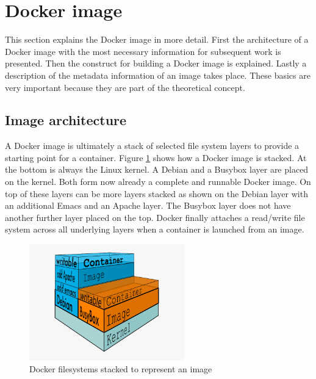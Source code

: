 \section{Docker image}
\label{sec:intro:docker_image:docker_img}
This section explains the Docker image in more detail. First the architecture of a Docker image with the most necessary information for subsequent work is presented. Then the construct for building a Docker image is explained. 
Lastly a description of the metadata information of an image takes place. These basics are very important because they are part of the theoretical concept.

\subsection{Image architecture}
\label{sec:intro:docker_image:docker_img:architecture}
A Docker image is ultimately a stack of selected file system layers to provide a starting point for a container.
Figure \ref{sec:intro:docker_image:docker_image_stack} shows how a Docker image is stacked. At the bottom is always the Linux kernel. A Debian and a Busybox layer are placed on the kernel.
Both form now already a complete and runnable Docker image.
On top of these layers can be more layers stacked as shown on the Debian layer with an additional Emacs and an Apache layer. The Busybox layer does not have another further layer placed on the top.
Docker finally attaches a read/write file system across all underlying layers when a container is launched from an image.
\begin{figure}[htbp]
 \centering
 \includegraphics[width=0.6\textwidth]{gfx/examples/docker-filesystems-busyboxrw}
 \caption{Docker filesystems stacked to represent an image}
\label{sec:intro:docker_image:docker_image_stack}
\end{figure}

